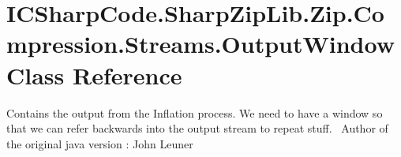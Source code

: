 \hypertarget{class_i_c_sharp_code_1_1_sharp_zip_lib_1_1_zip_1_1_compression_1_1_streams_1_1_output_window}{}\section{I\+C\+Sharp\+Code.\+Sharp\+Zip\+Lib.\+Zip.\+Compression.\+Streams.\+Output\+Window Class Reference}
\label{class_i_c_sharp_code_1_1_sharp_zip_lib_1_1_zip_1_1_compression_1_1_streams_1_1_output_window}


Contains the output from the Inflation process. We need to have a window so that we can refer backwards into the output stream to repeat stuff.~\newline
 Author of the original java version \+: John Leuner  


